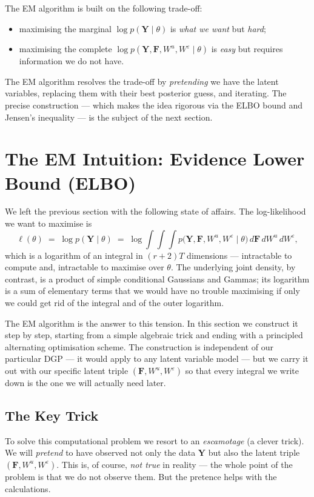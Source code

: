 \documentclass[11pt, a4paper, oneside]{article}
\newcommand{\mY}{\mathbf{Y}}
\newcommand{\mF}{\mathbf{F}}
\begin{document}
The EM algorithm is built on the following trade-off:
\begin{itemize}[leftmargin=1.5em, itemsep=2pt]
    \item maximising the marginal $\log p(\mY \mid \theta)$ is
          \emph{what we want} but \emph{hard};
    \item maximising the complete $\log p(\mY, \mF, W^u, W^\varepsilon \mid \theta)$
          is \emph{easy} but requires information we do not have.
\end{itemize}
The EM algorithm resolves the trade-off by \emph{pretending} we have the
latent variables, replacing them with their best posterior guess, and
iterating. The precise construction — which makes the idea rigorous via
the ELBO bound and Jensen's inequality — is the subject of the next
section.

\section{The EM Intuition: Evidence Lower Bound (ELBO)}
\label{sec:elbo}

We left the previous section with the following state of affairs.
The log-likelihood we want to maximise is
\[
\ell(\theta) \;=\; \log p(\mY \mid \theta) \;=\; \log \int\!\int\!\int
p\big(\mY, \mF, W^u, W^\varepsilon \mid \theta\big)\, d\mF\, dW^u\, dW^\varepsilon,
\]
which is a logarithm of an integral in $(r+2)T$ dimensions — intractable
to compute and, intractable to maximise over $\theta$. The
underlying joint density, by contrast, is a product of simple conditional
Gaussians and Gammas; its logarithm is a sum of elementary terms that we
would have no trouble maximising if only we could get rid of the integral
and of the outer logarithm.

The EM algorithm is the answer to this tension. In this section we
construct it step by step, starting from a simple algebraic trick and
ending with a principled alternating optimisation scheme. The construction
is independent of our particular DGP — it would apply to any latent
variable model — but we carry it out with our specific latent triple
$(\mF, W^u, W^\varepsilon)$ so that every integral we write down is the
one we will actually need later.

\subsection{The Key Trick}

To solve this computational problem we resort to an \emph{escamotage}
(a clever trick). We will \emph{pretend} to have observed not only the
data $\mY$ but also the latent triple $(\mF, W^u, W^\varepsilon)$. This
is, of course, \emph{not true} in reality — the whole point of the
problem is that we do not observe them. But the pretence helps with the
calculations.
\end{document}
